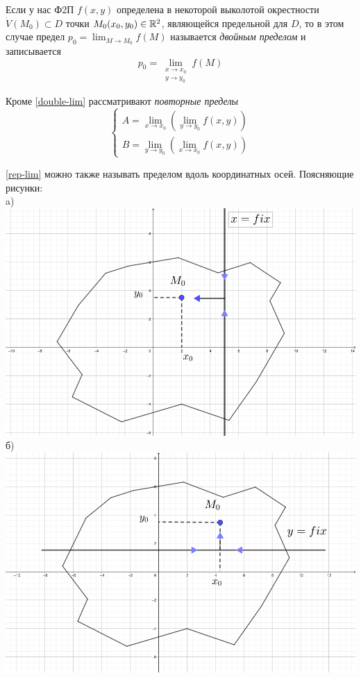 \documentclass[../../main.tex]{subfiles}
\begin{document}
Если у нас Ф2П $f(x, y)$ определена в некоторой выколотой окрестности 
$\dot{V}(M_0) \subset D$ точки $M_0(x_0, y_0) \in \mathbb{R}^2$,
являющейся предельной для $D$, то в этом случае  предел
$p_0 = \displaystyle \lim_{M \to M_0}{f(M)}$ называется
\emph{двойным пределом} и записывается 
\begin{equation}
\label{double-lim}
p_0 = \underset{\substack{
	x \to x_0 \\
	y \to y_0
}}{\lim}f(M)
\end{equation}

Кроме \eqref{double-lim} рассматривают \emph{повторные пределы}
\begin{equation}
\label{rep-lim}
	\left\{\begin{aligned}
		A = \displaystyle\lim_{x \to x_0}{(\lim_{y \to y_0}{f(x, y)})} \\
		B = \displaystyle\lim_{y \to y_0}{(\lim_{x \to x_0}{f(x, y)})} 
	\end{aligned}\right.
\end{equation}

\eqref{rep-lim} можно также называть пределом вдоль координатных осей.
Поясняющие рисунки: \\
a) 
\includegraphics[scale=0.33]{rep-lim-case-a.png}
б) 
\includegraphics[scale=0.33]{rep-lim-case-b.png}
\end{document}
